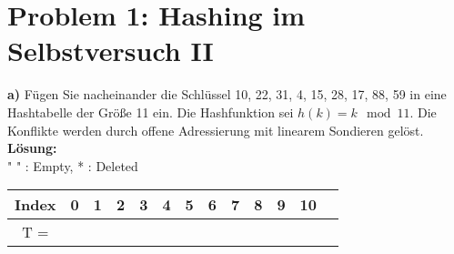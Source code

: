 \section*{{Problem 1: Hashing im Selbstversuch II}}

\noindent
\textbf{a)} Fügen Sie nacheinander die Schlüssel 10, 22, 31, 4, 15, 28, 17, 88, 59 in eine Hashtabelle der Größe 11 ein. Die Hashfunktion sei $h(k) = k \mod 11$. Die Konflikte werden durch offene Adressierung mit linearem Sondieren gelöst.\\



\noindent
\textbf{Lösung:}\\ "  " : Empty, * : Deleted\\
\begin{center}
\begin{tabular}{|c|c|c|c|c|c|c|c|c|c|c|c|c|}
\hline
Index & 0 & 1 & 2 & 3 & 4 & 5 & 6 & 7 & 8 & 9 & 10\\
\hline
T = & & & & & & & & & & & \\
\hline
\end{tabular}
\end{center}

